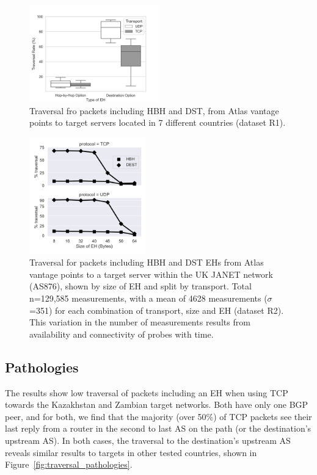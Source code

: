 \documentclass[conference]{IEEEtran}
\begin{document}


\begin{figure}
\centering
  \includegraphics[width=0.5\textwidth]{all_traversal.png}
  \caption{Traversal fro packets including HBH and DST, from Atlas vantage points to target servers located in 7 different countries (dataset R1).}
  \label{fig:countrybox}
\end{figure}

\begin{figure}
\centering
  \includegraphics[width=0.45\textwidth]{sizes.png}
  \caption{Traversal for packets including HBH and DST EHs from Atlas vantage points to a target server within the UK JANET network (AS876), shown by size of EH and split by transport.  Total n=129,585 measurements, with a mean of 4628 measurements ($\sigma$=351) for each combination of transport, size and EH  (dataset R2). This variation in the number of measurements results from availability and connectivity of  probes with time.}
  \label{fig:sizes}
\end{figure}

\subsection{Pathologies}
    \label{subsec: pathologies}

The results show low traversal of packets including an EH when using TCP towards the Kazakhstan and Zambian target networks. Both have only one BGP peer, and for both, we find that the majority (over 50\%) of TCP packets see their last reply from a router in the second to last AS on the path (or the destination's upstream AS). In both cases, the traversal to the destination's upstream AS reveals similar results to targets in other tested countries, shown in Figure~\ref{fig:traversal_pathologies}.
\end{document}
